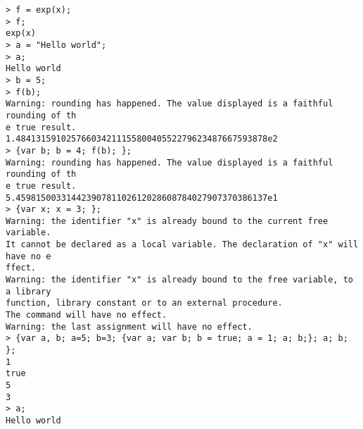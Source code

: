 \begin{center}\begin{minipage}{15cm}\begin{Verbatim}[frame=single]
> f = exp(x);
> f;
exp(x)
> a = "Hello world";
> a;
Hello world
> b = 5;
> f(b);
Warning: rounding has happened. The value displayed is a faithful rounding of th
e true result.
1.48413159102576603421115580040552279623487667593878e2
> {var b; b = 4; f(b); };
Warning: rounding has happened. The value displayed is a faithful rounding of th
e true result.
5.45981500331442390781102612028608784027907370386137e1
> {var x; x = 3; };
Warning: the identifier "x" is already bound to the current free variable.
It cannot be declared as a local variable. The declaration of "x" will have no e
ffect.
Warning: the identifier "x" is already bound to the free variable, to a library 
function, library constant or to an external procedure.
The command will have no effect.
Warning: the last assignment will have no effect.
> {var a, b; a=5; b=3; {var a; var b; b = true; a = 1; a; b;}; a; b; };
1
true
5
3
> a;
Hello world
\end{Verbatim}
\end{minipage}\end{center}
